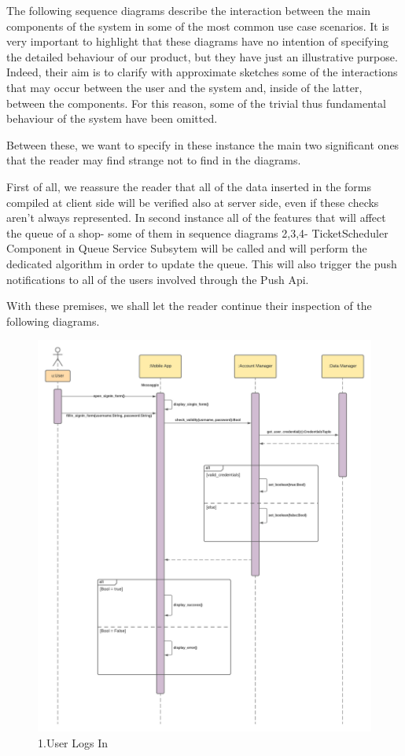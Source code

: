 The following sequence diagrams describe the interaction between the main components of the system in some of the most common use case scenarios. It is very important to highlight that these diagrams have no intention of specifying the detailed behaviour of our product, but they have just an illustrative purpose. Indeed, their aim is to clarify with approximate sketches some of the interactions that may occur between the user and the system and, inside of the latter, between the components.
For this reason, some of the trivial thus fundamental behaviour of the system have been omitted. 

Between these, we want to specify in these instance the main two significant ones that the reader may find strange not to find in the diagrams.

First of all, we reassure the reader that all of the data inserted in the forms compiled at client side will be verified also at server side, even if these checks aren't always represented.
In second instance all of the features that will affect the queue of a shop- some of them in sequence diagrams 2,3,4- TicketScheduler Component in Queue Service Subsytem will be called and will perform the dedicated algorithm in order to update the queue. This will also trigger the push notifications to all of the users involved through the Push Api.

With these premises, we shall let the reader continue their inspection of the following diagrams.

\begin{figure}[h!]
    \centering
    \includegraphics[width=1\textwidth]{Images/runtimeViewDD/RunTimeViewUserLogIn (1).png}
    \caption{\label{fig:RunTimeViewUserLogsIn}{1.User Logs In}}
\end{figure}

